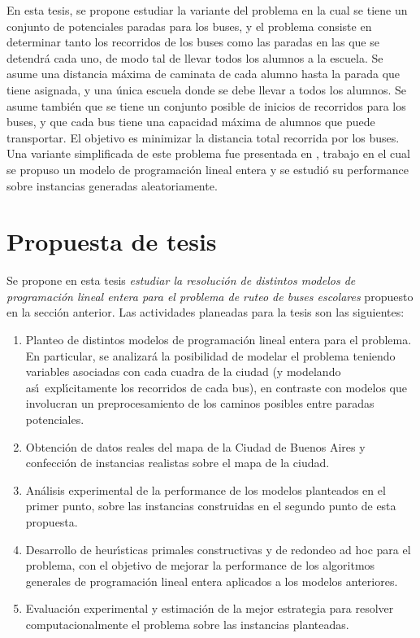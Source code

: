 \documentclass[11pt, a4paper]{article}
\begin{document}
En esta tesis, se propone estudiar la variante del problema en la cual se tiene un conjunto de potenciales paradas para los buses, y el problema consiste en determinar tanto los recorridos de los buses como las paradas en las que se detendr\'a cada uno, de modo tal de llevar todos los alumnos a la escuela. Se asume una distancia m\'axima de caminata de cada alumno hasta la parada que tiene asignada, y una \'unica escuela donde se debe llevar a todos los alumnos. Se asume tambi\'en que se tiene un conjunto posible de inicios de recorridos para los buses, y que cada bus tiene una capacidad m\'axima de alumnos que puede transportar. El objetivo es minimizar la distancia total recorrida por los buses. Una variante simplificada de este problema fue presentada en \cite{sorensen16}, trabajo en el cual se propuso un modelo de programaci\'on lineal entera y se estudi\'o su performance sobre instancias generadas aleatoriamente.

\section{Propuesta de tesis}

Se propone en esta tesis \emph{estudiar la resoluci\'on de distintos modelos de programaci\'on lineal entera para el problema de ruteo de buses escolares} pro\-pues\-to en la secci\'on anterior. Las actividades planeadas para la tesis son las siguientes:
\begin{enumerate}
\item Planteo de distintos modelos de programaci\'on lineal entera para el problema. En particular, se analizar\'a la posibilidad de modelar el problema teniendo variables asociadas con cada cuadra de la ciudad (y modelando as\'\i\ expl\'\i citamente los recorridos de cada bus), en contraste con modelos que involucran un preprocesamiento de los caminos posibles entre paradas potenciales.
\item Obtenci\'on de datos reales del mapa de la Ciudad de Buenos Aires y confecci\'on de instancias realistas sobre el mapa de la ciudad.
\item An\'alisis experimental de la performance de los modelos planteados en el primer punto, sobre las instancias construidas en el segundo punto de esta propuesta.
\item Desarrollo de heur\'\i sticas primales constructivas y de redondeo ad hoc para el problema, con el objetivo de mejorar la performance de los algoritmos generales de programaci\'on lineal entera aplicados a los modelos anteriores.
\item Evaluaci\'on experimental y estimaci\'on de la mejor estrategia para resolver computacionalmente el problema sobre las instancias planteadas.
\end{enumerate}
\end{document}
